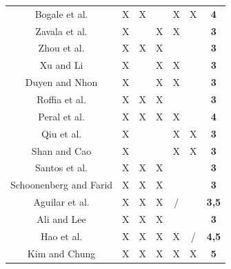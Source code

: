 \begin{table}[H]
{\begin{tabular}{ccccccc}
Bogale et al. \citep{bogaleetal}         & X           & X           &             & X           & X           & \textbf{4}                \\ 
Zavala et al. \citep{zavalaetal}        & X           &             & X           & X           &             & \textbf{3}                \\ 
Zhou et al. \citep{zhouetal}           & X           & X           & X           &             &             & \textbf{3}                \\ 
Xu and Li  \citep{xuandli}            & X           &             & X           & X           &             & \textbf{3}                \\ 
Duyen and Nhon  \citep{duyenandnhon}       & X           &             & X           & X           &             & \textbf{3}                \\
Roffia et al.  \citep{roffiaetal}        & X           & X           & X           &             &             & \textbf{3}                \\ 
Peral et al. \citep{peraletal}          & X           & X           & X           & X           &             & \textbf{4}                \\ 
Qiu et al. \citep{qiuetal}            & X           &             &             & X           & X           & \textbf{3}                \\ 
Shan and Cao \citep{shanandcao}          & X           &             &             & X           & X           & \textbf{3}                \\ 
Santos et al. \citep{santosetal}         & X           & X           & X           &             &             & \textbf{3}                \\ 
Schoonenberg and Farid \citep{santosetal} & X           & X           & X           &             &             & \textbf{3}                \\ 
Aguilar et al. \citep{aguilaretal}         & X           & X           & X           & /           &             & \textbf{3,5}              \\ 
Ali and Lee \citep{aliandlee}           & X           & X           & X           &             &             & \textbf{3}                \\ 
Hao et al. \citep{haoetal}            & X           & X           & X           & X           & /           & \textbf{4,5}              \\ 
Kim and Chung \citep{kimandchung}         & X           & X           & X           & X           & X           & \textbf{5}                \\ 

\end{tabular}}
\end{table}
